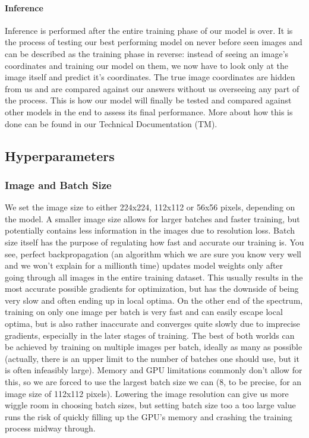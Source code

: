 \documentclass[]{article}
\let\oldparagraph\paragraph
\renewcommand{\paragraph}[1]{\oldparagraph{#1}\mbox{}}
\begin{document}
\hypertarget{inference}{%
\paragraph{Inference}\label{inference}}

Inference is performed after the entire training phase of our model is
over. It is the process of testing our best performing model on never
before seen images and can be described as the training phase in
reverse: instead of seeing an image's coordinates and training our model
on them, we now have to look only at the image itself and predict it's
coordinates. The true image coordinates are hidden from us and are
compared against our answers without us overseeing any part of the
process. This is how our model will finally be tested and compared
against other models in the end to assess its final performance. More
about how this is done can be found in our Technical Documentation (TM).

\hypertarget{hyperparameters}{%
\subsection{Hyperparameters}\label{hyperparameters}}

\hypertarget{image-and-batch-size}{%
\subsubsection{Image and Batch Size}\label{image-and-batch-size}}

We set the image size to either 224x224, 112x112 or 56x56 pixels,
depending on the model. A smaller image size allows for larger batches
and faster training, but potentially contains less information in the
images due to resolution loss. Batch size itself has the purpose of
regulating how fast and accurate our training is. You see, perfect
backpropagation (an algorithm which we are sure you know very well and
we won't explain for a millionth time) updates model weights only after
going through all images in the entire training dataset. This usually
results in the most accurate possible gradients for optimization, but
has the downside of being very slow and often ending up in local optima.
On the other end of the spectrum, training on only one image per batch
is very fast and can easily escape local optima, but is also rather
inaccurate and converges quite slowly due to imprecise gradients,
especially in the later stages of training. The best of both worlds can
be achieved by training on multiple images per batch, ideally as many as
possible (actually, there is an upper limit to the number of batches one
should use, but it is often infeasibly large). Memory and GPU
limitations commonly don't allow for this, so we are forced to use the
largest batch size we can (8, to be precise, for an image size of
112x112 pixels). Lowering the image resolution can give us more wiggle
room in choosing batch sizes, but setting batch size too a too large
value runs the risk of quickly filling up the GPU's memory and crashing
the training process midway through.
\end{document}

